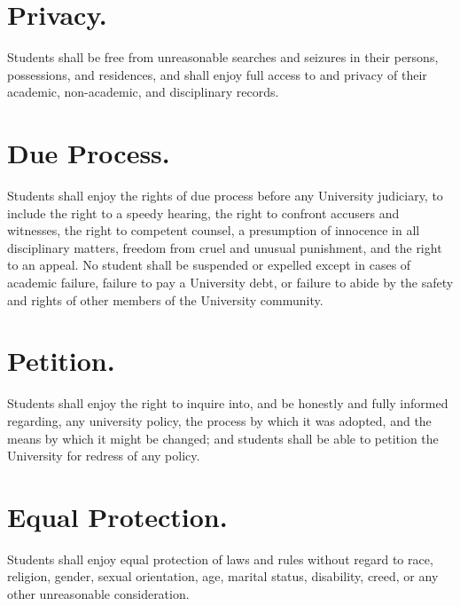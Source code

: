 \section{Privacy.}
    Students shall be free from unreasonable searches and seizures in their persons, possessions, and residences, and shall enjoy full access to and privacy of their academic, non-academic, and disciplinary records.

\section{Due Process.}
    Students shall enjoy the rights of due process before any University judiciary, to include the right to a speedy hearing, the right to confront accusers and witnesses, the right to competent counsel, a presumption of innocence in all disciplinary matters, freedom from cruel and unusual punishment, and the right to an appeal. No student shall be suspended or expelled except in cases of academic failure, failure to pay a University debt, or failure to abide by the safety and rights of other members of the University community.

\section{Petition.}
    Students shall enjoy the right to inquire into, and be honestly and fully informed regarding, any university policy, the process by which it was adopted, and the means by which it might be changed; and students shall be able to petition the University for redress of any policy.

\section{Equal Protection.}
    Students shall enjoy equal protection of laws and rules without regard to race, religion, gender, sexual orientation, age, marital status, disability, creed, or any other unreasonable consideration.